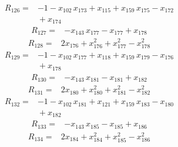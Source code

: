 \documentclass[11pt]{article}
\begin{document}
\begin{equation*}\begin{aligned}
R_{126}={}&-1 - x_{102}\,x_{173} + x_{115} + x_{159}\,x_{175} - x_{172} \\
&{} + x_{174}
\end{aligned}\end{equation*}
\begin{equation*}\begin{aligned}
R_{127}={}&-x_{143}\,x_{177} - x_{177} + x_{178}
\end{aligned}\end{equation*}
\begin{equation*}\begin{aligned}
R_{128}={}&2x_{176} + x_{176}^{2} + x_{177}^{2} - x_{178}^{2}
\end{aligned}\end{equation*}
\begin{equation*}\begin{aligned}
R_{129}={}&-1 - x_{102}\,x_{177} + x_{118} + x_{159}\,x_{179} - x_{176} \\
&{} + x_{178}
\end{aligned}\end{equation*}
\begin{equation*}\begin{aligned}
R_{130}={}&-x_{143}\,x_{181} - x_{181} + x_{182}
\end{aligned}\end{equation*}
\begin{equation*}\begin{aligned}
R_{131}={}&2x_{180} + x_{180}^{2} + x_{181}^{2} - x_{182}^{2}
\end{aligned}\end{equation*}
\begin{equation*}\begin{aligned}
R_{132}={}&-1 - x_{102}\,x_{181} + x_{121} + x_{159}\,x_{183} - x_{180} \\
&{} + x_{182}
\end{aligned}\end{equation*}
\begin{equation*}\begin{aligned}
R_{133}={}&-x_{143}\,x_{185} - x_{185} + x_{186}
\end{aligned}\end{equation*}
\begin{equation*}\begin{aligned}
R_{134}={}&2x_{184} + x_{184}^{2} + x_{185}^{2} - x_{186}^{2}
\end{aligned}\end{equation*}
\end{document}
